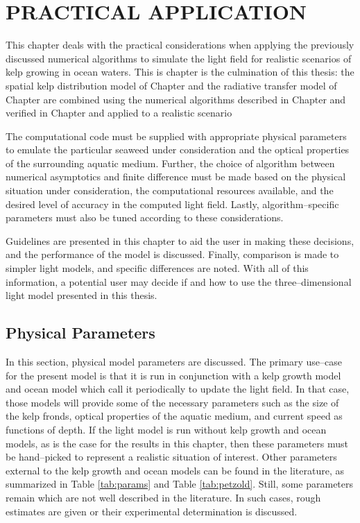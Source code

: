 \chapter{PRACTICAL APPLICATION}
\label{chap:application}

This chapter deals with the practical considerations when applying the previously discussed numerical algorithms to simulate the light field for realistic scenarios of kelp growing in ocean waters.
This is chapter is the culmination of this thesis: the spatial kelp distribution model of Chapter \Rom{\ref{chap:kelp}} and the radiative transfer model of Chapter \Rom{\ref{chap:light}} are combined using the numerical algorithms described in Chapter \Rom{\ref{chap:numerical}} and verified in Chapter \Rom{\ref{chap:model_analysis}} and applied to a realistic scenario

The computational code must be supplied with appropriate physical parameters to emulate the particular seaweed under consideration and the optical properties of the surrounding aquatic medium.
Further, the choice of algorithm between numerical asymptotics and finite difference must be made based on the physical situation under consideration, the computational resources available, and the desired level of accuracy in the computed light field.
Lastly, algorithm--specific parameters must also be tuned according to these considerations.

Guidelines are presented in this chapter to aid the user in making these decisions, and the performance of the model is discussed.
Finally, comparison is made to simpler light models, and specific differences are noted.
With all of this information, a potential user may decide if and how to use the three--dimensional light model presented in this thesis.

\section{Physical Parameters}
\label{sec:parameters}
In this section, physical model parameters are discussed.
The primary use--case for the present model is that it is run in conjunction with a kelp growth model and ocean model
which call it periodically to update the light field.
In that case, those models will provide some of the necessary parameters such as the size of the kelp fronds, optical properties of the aquatic medium, and current speed as functions of depth.
If the light model is run without kelp growth and ocean models, as is the case for the results in this chapter, then these parameters must be hand--picked to represent a realistic situation of interest.
Other parameters external to the kelp growth and ocean models can be found in the literature,
as summarized in Table \ref{tab:params} and Table \ref{tab:petzold}.
Still, some parameters remain which are not well described in the literature.
In such cases, rough estimates are given or their experimental determination is discussed.

